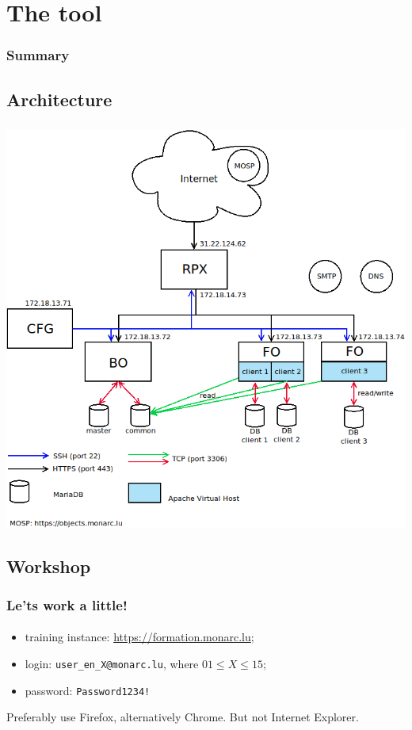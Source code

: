 %
%
\section{The tool}
\begin{frame}
    \frametitle{Summary}
\end{frame}
\subsection{Architecture}
\begin{frame}
    \frametitle{}
    \framesubtitle{}
    \begin{center}
        \includegraphics[scale=0.3]{../common_pictures/monarc-architecture.png}
    \end{center}
\end{frame}



\subsection{Workshop}
\begin{frame}
    \frametitle{Le'ts work a little!}
    \framesubtitle{}
    \begin{itemize}
        \item training instance: \url{https://formation.monarc.lu};
        \item login: \texttt{user\_en\_X@monarc.lu}, where $01 \leq X \leq 15$;
        \item password: \texttt{Password1234!}
    \end{itemize}
    \bigskip
    Preferably use Firefox, alternatively Chrome. But not Internet Explorer.
\end{frame}



